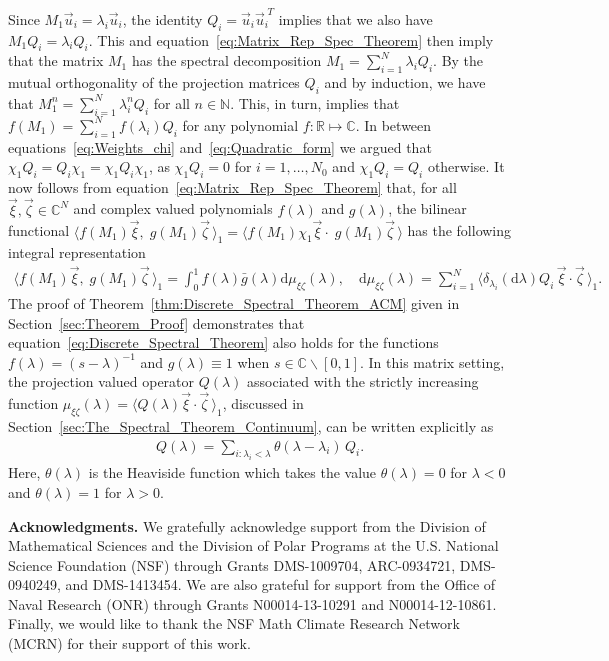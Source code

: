 \documentclass{cmslatex}
\renewcommand{\d}{\text{d}}
\begin{document}
Since $M_1\vec{u}_i=\lambda_i\vec{u}_i$, the identity $Q_i=\vec{u}_i\vec{u}_i^{\;T}$
implies that we also have $M_1Q_i=\lambda_iQ_i$. This and
equation~\eqref{eq:Matrix_Rep_Spec_Theorem} then imply that the matrix
$M_1$ has the spectral decomposition $M_1=\sum_{i=1}^N\lambda_iQ_i$. By the mutual
orthogonality of the projection matrices $Q_i$ and by induction, we
have that  
$M_1^n=\sum_{i=1}^N\lambda_i^nQ_i$ for all $n\in\mathbb{N}$. This, in turn,
implies that $f(M_1)=\sum_{i=1}^Nf(\lambda_i)Q_i$ for any polynomial
$f:\mathbb{R}\mapsto\mathbb{C}$. In between equations~\eqref{eq:Weights_chi}
and~\eqref{eq:Quadratic_form} we argued that
$\chi_1Q_i=Q_i\chi_1=\chi_1Q_i\chi_1$, as $\chi_1Q_i=0$ for $i=1,\ldots,N_0$ and $\chi_1Q_i=Q_i$ otherwise.
It now follows from equation~\eqref{eq:Matrix_Rep_Spec_Theorem} that, for
all $\vec{\xi},\vec{\zeta}\in\mathbb{C}^N$ and complex valued polynomials
$f(\lambda)$ and $g(\lambda)$, the bilinear functional
$\langle f(M_1)\vec{\xi},\;g(M_1)\vec{\zeta}\,\rangle_1=\langle f(M_1)\chi_1\vec{\xi}\cdot\;g(M_1)\vec{\zeta}\,\rangle$
has the following integral representation 
%
\begin{align}\label{eq:Discrete_Spectral_Theorem}
  \langle f(M_1)\vec{\xi},\;g(M_1)\vec{\zeta}\,\rangle_1= \int_0^1f(\lambda)\bar{g}(\lambda)\d\mu_{\xi\zeta}(\lambda), \quad
  \d\mu_{\xi\zeta}(\lambda)=\sum_{i=1}^N\langle\delta_{\lambda_i}(\d\lambda)Q_i\,\vec{\xi}\cdot\vec{\zeta}\,\rangle_1.
\end{align}
%
The proof of Theorem~\ref{thm:Discrete_Spectral_Theorem_ACM} given in
Section~\ref{sec:Theorem_Proof} demonstrates that
equation~\eqref{eq:Discrete_Spectral_Theorem} also holds for the
functions $f(\lambda)=(s-\lambda)^{-1}$ and $g(\lambda)\equiv1$ when $s\in\mathbb{C}\backslash[0,1]$. In
this matrix setting, the projection valued operator $Q(\lambda)$ associated
with the strictly increasing function  $\mu_{\xi\zeta}(\lambda)=\langle
Q(\lambda)\vec{\xi}\cdot\vec{\zeta}\,\rangle_1$, discussed in
Section~\ref{sec:The_Spectral_Theorem_Continuum}, can be written
explicitly as  
% 
\begin{align}
  Q(\lambda)=\sum_{i:\lambda_i<\lambda}\theta(\lambda-\lambda_i)\,Q_i.
\end{align}
%
Here, $\theta(\lambda)$ is the Heaviside function which takes the value $\theta(\lambda)=0$
for $\lambda<0$ and $\theta(\lambda)=1$ for $\lambda>0$. 






\medskip

{\bf Acknowledgments.}
We gratefully acknowledge support from the Division of Mathematical
Sciences and the Division of Polar Programs at the U.S. National
Science Foundation (NSF) through Grants DMS-1009704, ARC-0934721,
DMS-0940249, and DMS-1413454. We are also grateful for support from
the Office of Naval Research (ONR) through Grants N00014-13-10291 and
N00014-12-10861. Finally, we would like to thank the NSF Math Climate
Research Network (MCRN) for their support of this work. 



\medskip



\end{document}
